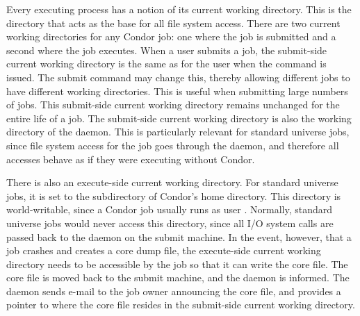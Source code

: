 Every executing process has a notion of its current working directory.
This is the directory that acts as the base for all file system
access. 
There are two current working directories for any Condor job:
one where the job is submitted and a
second where the job executes.
When a user submits a job,
the submit-side current working directory is
the same as for the user when the  command
is issued.
The  submit command may change this,
thereby allowing different jobs to have different working
directories.
This is useful when submitting large numbers of jobs.
This submit-side current working directory remains unchanged for the
entire life of a job. 
The submit-side current working directory is also 
the working directory of the  daemon.
This is particularly relevant for standard universe jobs,
since file system
access for the job goes through the  daemon, and
therefore all accesses behave as if they were executing without
Condor.

There is also an execute-side current working directory.
For standard universe jobs,
it is set to the
 subdirectory of Condor's home directory.
This directory is world-writable, since a Condor job usually runs as user
.
Normally, standard universe jobs would never access this directory,
since all I/O system calls are passed back to the
 daemon on the submit machine.
In the event, however,
that a job crashes and creates a core dump file, the execute-side
current working directory needs to be accessible by the job
so that it can write the core file.
The core file is moved back to the submit machine,
and the  daemon is informed.
The  daemon
sends e-mail to the job owner announcing the core file, and provides a
pointer to where
the core file resides in the submit-side current working directory.





